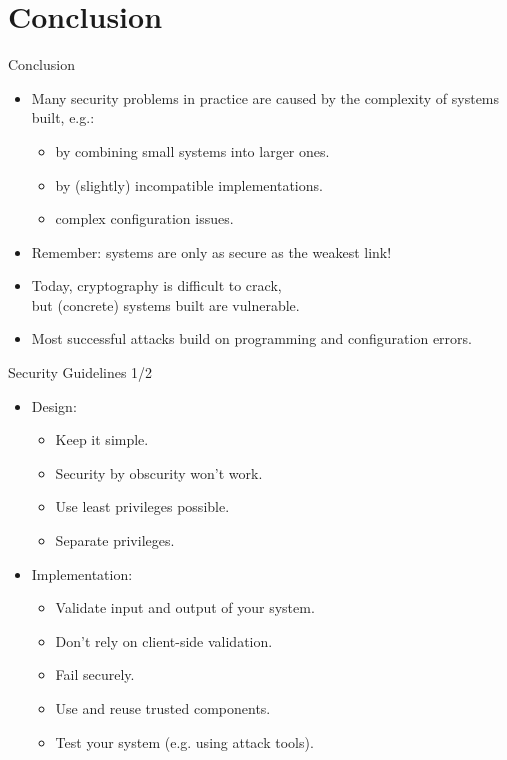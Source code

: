\documentclass{beamer}
\begin{document}
\section{Conclusion}
\begin{slide}{Conclusion}
  \begin{itemize}
    \item  Many security problems in practice are caused by
           the complexity of systems built, e.g.:
    \begin{itemize}
      \item by combining small systems into larger ones.
      \item by (slightly) incompatible implementations.
      \item complex configuration issues.
    \end{itemize}
    \item \alert{Remember:} systems are only as secure as the weakest link!
    \item Today, cryptography is difficult to crack,\\
       but (concrete) systems built are vulnerable.
    \item Most successful attacks build on programming and configuration errors.
  \end{itemize}
\end{slide}
\begin{slide}{Security Guidelines 1/2}
  \begin{itemize}
    \item Design:
    \begin{itemize}
      \item Keep it simple.
      \item Security by obscurity won't work.
      \item Use least privileges possible. 
      \item Separate privileges. 
    \end{itemize}
    \item Implementation:
    \begin{itemize}
      \item Validate input and output of your system.
      \item Don't rely on client-side validation.
      \item Fail securely.
      \item Use and reuse trusted components.
      \item Test your system (e.g. using attack tools).
    \end{itemize}
  \end{itemize}
\end{slide}
\end{document}
